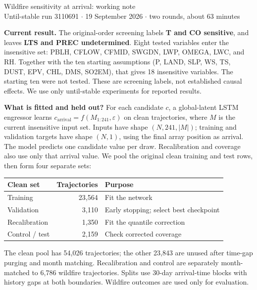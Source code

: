 \documentclass[11pt]{article}
\begin{document}
\begin{center}
{\Large Wildfire sensitivity at arrival: working note}\\[4pt]
Until-stable run 3110691 $\cdot$ 19 September 2026 $\cdot$ two rounds, about 63 minutes
\end{center}

\textbf{Current result.}
The original-order screening labels \textbf{T and CO sensitive}, and leaves
\textbf{LTS and PREC undetermined}. Eight tested variables enter the insensitive set:
PBLH, CFLOW, CFMID, SWGDN, LWP, OMEGA, LWC, and RH. Together with the ten starting
assumptions (P, LAND, SLP, WS, TS, DUST, EPV, CHL, DMS, SO2EM), that gives
18 insensitive variables. The starting ten were not tested. These are screening
labels, not established causal effects. We use only until-stable experiments for
reported results.

\textbf{What is fitted and held out?}
For each candidate $c$, a global-latent LSTM engressor learns
$c_{\mathrm{arrival}}=f(M_{1:241},\varepsilon)$ on clean trajectories, where $M$ is
the current insensitive input set. Inputs have shape $(N,241,|M|)$; training and
validation targets have shape $(N,1)$, using the final array position as arrival.
The model predicts one candidate value per draw. Recalibration and coverage also
use only that arrival value. We pool the original clean
training and test rows, then form four separate sets:

\begin{center}
\begin{tabular}{lrl}
\toprule
Clean set & Trajectories & Purpose \\
\midrule
Training & 23,564 & Fit the network \\
Validation & 3,110 & Early stopping; select best checkpoint \\
Recalibration & 1,350 & Fit the quantile correction \\
Control / test & 2,159 & Check corrected coverage \\
\bottomrule
\end{tabular}
\end{center}

The clean pool has 54,026 trajectories; the other 23,843 are unused after time-gap
purging and month matching. Recalibration and control are separately month-matched
to 6,786 wildfire trajectories. Splits use 30-day arrival-time blocks with history
gaps at both boundaries. Wildfire outcomes are used only for evaluation.
\end{document}
